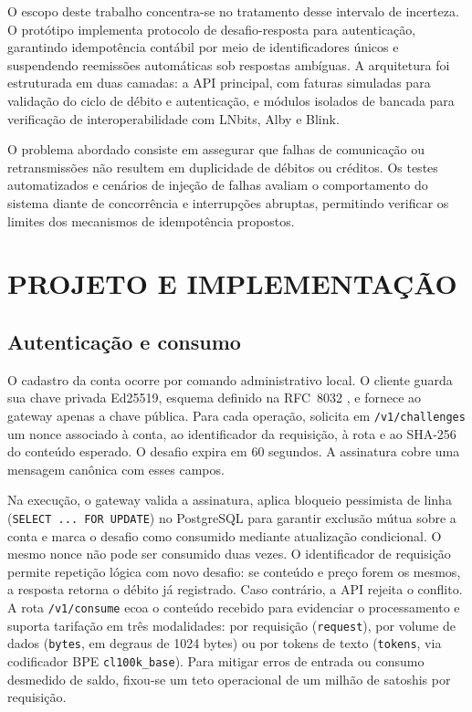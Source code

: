 \documentclass[openright]{normas-utf-tex}
\begin{document}
O escopo deste trabalho concentra-se no tratamento desse intervalo de incerteza. O protótipo implementa protocolo de desafio-resposta para autenticação, garantindo idempotência contábil por meio de identificadores únicos e suspendendo reemissões automáticas sob respostas ambíguas. A arquitetura foi estruturada em duas camadas: a API principal, com faturas simuladas para validação do ciclo de débito e autenticação, e módulos isolados de bancada para verificação de interoperabilidade com LNbits, Alby e Blink.

O problema abordado consiste em assegurar que falhas de comunicação ou retransmissões não resultem em duplicidade de débitos ou créditos. Os testes automatizados e cenários de injeção de falhas avaliam o comportamento do sistema diante de concorrência e interrupções abruptas, permitindo verificar os limites dos mecanismos de idempotência propostos.

\chapter{PROJETO E IMPLEMENTAÇÃO}
\section{Autenticação e consumo}
O cadastro da conta ocorre por comando administrativo local. O cliente guarda sua chave privada Ed25519, esquema definido na RFC~8032 \cite{rfc8032}, e fornece ao gateway apenas a chave pública. Para cada operação, solicita em \texttt{/v1/challenges} um nonce associado à conta, ao identificador da requisição, à rota e ao SHA-256 do conteúdo esperado. O desafio expira em 60 segundos. A assinatura cobre uma mensagem canônica com esses campos.

Na execução, o gateway valida a assinatura, aplica bloqueio pessimista de linha (\texttt{SELECT ... FOR UPDATE}) no PostgreSQL para garantir exclusão mútua sobre a conta e marca o desafio como consumido mediante atualização condicional. O mesmo nonce não pode ser consumido duas vezes. O identificador de requisição permite repetição lógica com novo desafio: se conteúdo e preço forem os mesmos, a resposta retorna o débito já registrado. Caso contrário, a API rejeita o conflito. A rota \texttt{/v1/consume} ecoa o conteúdo recebido para evidenciar o processamento e suporta tarifação em três modalidades: por requisição (\texttt{request}), por volume de dados (\texttt{bytes}, em degraus de 1024 bytes) ou por tokens de texto (\texttt{tokens}, via codificador BPE \texttt{cl100k\_base}). Para mitigar erros de entrada ou consumo desmedido de saldo, fixou-se um teto operacional de um milhão de satoshis por requisição.
\end{document}
